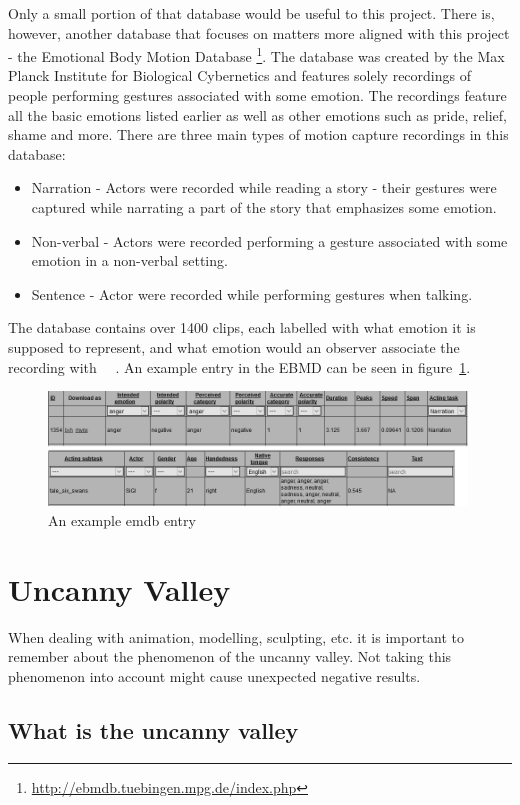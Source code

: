 Only a small portion of that database would be useful to this project. There is, however, another database that focuses on matters more aligned with this project - the Emotional Body Motion Database \footnote{\url{http://ebmdb.tuebingen.mpg.de/index.php}}. The database was created by the Max Planck Institute for Biological Cybernetics and features solely recordings of people performing gestures associated with some emotion. The recordings feature all the basic emotions listed earlier as well as other emotions such as pride, relief, shame and more. There are three main types of motion capture recordings in this database:
\begin{itemize}
\item Narration - Actors were recorded while reading a story - their gestures were captured while narrating a part of the story that emphasizes some emotion.
\item Non-verbal - Actors were recorded performing a gesture associated with some emotion in a non-verbal setting.
\item Sentence - Actor were recorded while performing gestures when talking.
\end{itemize}
The database contains over 1400 clips, each labelled with what emotion it is supposed to represent, and what emotion would an observer associate the recording with ~\cite{planck1}~\cite{planck2}. An example entry in the EBMD can be seen in  figure~\ref{fig:ebmd1}.

\begin{figure}[H]
\centerline{\includegraphics[width = 30em]{img/emo1.png}}
\caption{An example emdb entry}\label{fig:ebmd1}
\end{figure}


\section{Uncanny Valley}

When dealing with animation, modelling, sculpting, etc. it is important to remember about the phenomenon of the uncanny valley. Not taking this phenomenon into account might cause unexpected negative results.

\subsection{What is the uncanny valley}

